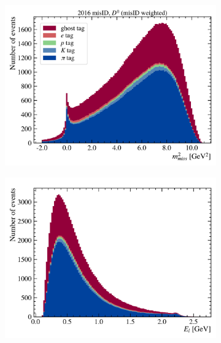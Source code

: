 \begin{figure}[!htb]
    \centering
    \begin{subfigure}[b]{0.32\textwidth}
        \centering
        \includegraphics[width=\textwidth]{figs-fit-fit-templates/data-driven-plots/misid/D0_mm2.pdf}
    \end{subfigure}
    \hfill
    \begin{subfigure}[b]{0.32\textwidth}
        \centering
        \includegraphics[width=\textwidth]{figs-fit-fit-templates/data-driven-plots/misid/D0_el}
    \end{subfigure}

\end{figure}
